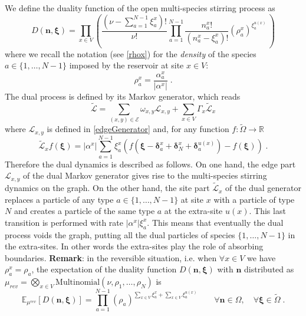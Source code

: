 \documentclass[10pt]{article}
\numberwithin{equation}{section}
\numberwithin{equation}{subsection}
\newcommand{\dt}{\;.}
\newcommand{\twoj}{\nu}
\begin{document}
We define the duality function of the open multi-species stirring process as
\begin{equation}\label{dualityElements}
	D(\bm{n},\bm{\xi})=\prod_{x\in V}\left(\frac{(\nu -\sum_{a=1}^{N-1}\xi_{a}^{x})!}{\nu!}\prod_{a=1}^{N-1}\frac{n_{a}^{x}!}{(n_{a}^{x}-\xi_{a}^{x})!}\left(\rho_{a}^{x}\right)^{\xi_{a}^{u(x)}}\,\right)
\end{equation}
where we recall the notation (see \eqref{rhox}) for the \textit{density} of the species $a\in \{1,\ldots,N-1\}$ imposed by the reservoir at site $x\in V$:
\begin{equation}
\rho_{a}^{x}=\frac{\alpha_{a}^{x}}{|\alpha^{x}|}\dt
\end{equation}
The dual process is defined by its Markov generator, which reads
 \begin{equation}\label{DualGenerator}
    \widetilde{\mathcal{L}}=\sum_{(x,y)\in \mathcal{E}}\omega_{x,y}\mathcal{L}_{x,y}+\sum_{x\in V}\Gamma_{x}\widetilde{\mathcal{L}}_{x}
\end{equation}
where 
$\mathcal{L}_{x,y}$ is defined in \eqref{edgeGenerator} and, for any function $f:\widetilde{\Omega}\to \mathbb{R}$ 
\begin{equation}\label{siteDualGenerator}
    \widetilde{\mathcal{L}}_{x}f(\bm{\xi})=|\alpha^{x}|\sum_{a=1}^{N-1}\xi_{a}^{x}\left(f(\bm{\xi}-\bm{\delta}_{a}^{x}+\bm{\delta}_{N}^{x}+\bm{\delta}_{a}^{u(x)})-f(\bm{\xi})\right)\dt
\end{equation}
\newline
Therefore the dual dynamics is described as follows. On one hand, the edge part $\mathcal{L}_{x,y}$ of the dual Markov generator gives rise to  the multi-species stirring dynamics on the graph. On the other hand, the site
part $\widetilde{\mathcal{L}}_{x}$ of the dual generator replaces a particle of any type $a\in\{1,\ldots,N-1\}$ at site $x$ with a particle of type $N$ and creates a particle of the same type $a$ at the extra-site $u(x)$. This last transition is performed with rate $|\alpha^{x}|\xi_{a}^{x}$. This means that eventually the dual process voids the graph, putting all the dual particles of species $\{1,\ldots,N-1\}$ in the extra-sites. In other words the extra-sites play the role of absorbing boundaries. 
\newline \newline
\textbf{Remark}: in the reversible situation, i.e. when $\forall x\in V$ we have $\rho_{a}^{x}=\rho_{a}$, the expectation  of the duality function  $D(\bm{n},\bm{\xi})$ with   $\bm{n}$ distributed as  $\mu_{rev} = \bigotimes_{x\in V}\text{Multinomial}\left(\twoj, \rho_{1},\ldots,\rho_{N}\right)$ is
\begin{equation}
\mathbb{E}_{\mu^{rev}}\left[D(\bm{n},\bm{\xi})\right]=\prod_{a=1}^{N-1}\left(\rho_{a}\right)^{\sum_{x\in V}\xi_{a}^{x}+\sum_{x\in V}\xi_{a}^{u(x)}}\qquad \forall \bm{n}\in \Omega,\quad\forall \bm{\xi}\in \widetilde{\Omega}\dt
\end{equation}
\end{document}
